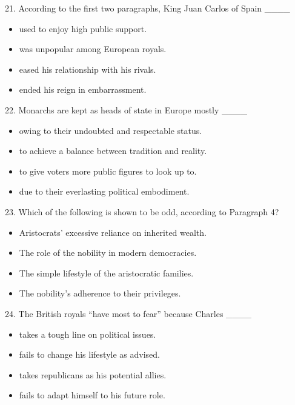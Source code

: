\documentclass[UTF8,11pt]{ctexart}
\begin{document}
21. According to the first two paragraphs, King Juan Carlos of Spain \_\_\_\_


\begin{itemize}[leftmargin=2em,itemsep=.2em,topsep=.4em]\item[A.] used to enjoy high public support.
\item[B.] was unpopular among European royals.
\item[C.] eased his relationship with his rivals.
\item[D.] ended his reign in embarrassment.
\end{itemize}

22. Monarchs are kept as heads of state in Europe mostly \_\_\_\_


\begin{itemize}[leftmargin=2em,itemsep=.2em,topsep=.4em]\item[A.] owing to their undoubted and respectable status.
\item[B.] to achieve a balance between tradition and reality.
\item[C.] to give voters more public figures to look up to.
\item[D.] due to their everlasting political embodiment.
\end{itemize}

23. Which of the following is shown to be odd, according to Paragraph 4?


\begin{itemize}[leftmargin=2em,itemsep=.2em,topsep=.4em]\item[A.] Aristocrats’ excessive reliance on inherited wealth.
\item[B.] The role of the nobility in modern democracies.
\item[C.] The simple lifestyle of the aristocratic families.
\item[D.] The nobility’s adherence to their privileges.
\end{itemize}

24. The British royals “have most to fear” because Charles \_\_\_\_


\begin{itemize}[leftmargin=2em,itemsep=.2em,topsep=.4em]\item[A.] takes a tough line on political issues.
\item[B.] fails to change his lifestyle as advised.
\item[C.] takes republicans as his potential allies.
\item[D.] fails to adapt himself to his future role.
\end{itemize}
\end{document}
